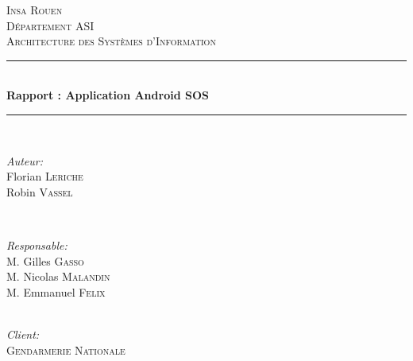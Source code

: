 \documentclass[a4paper,10pt]{report}
\begin{document}
\begin{titlepage}
	
	\newcommand{\HRule}{\rule{\linewidth}{0.5mm}}
	
	\center 
	
	
	\textsc{\LARGE Insa Rouen}\\[1.5cm] 
	\textsc{\Large Département ASI}\\[0.5cm] 
	\textsc{\large Architecture des Systèmes d'Information}\\[0.5cm] 
	
	
	\HRule \\[0.4cm]
	{ \huge \bfseries Rapport : Application Android SOS}\\[0.4cm] 
	\HRule \\[1.5cm]
	
	
	
	\begin{minipage}{0.4\textwidth}
		\begin{flushleft} \large
			\emph{Auteur:}\\
			Florian \textsc{Leriche}\\
			Robin \textsc{Vassel}
		\end{flushleft}
	\end{minipage}
	~
	\begin{minipage}{0.4\textwidth}
		\begin{flushright} \large
			\emph{Responsable:} \\
			M. Gilles \textsc{Gasso}\\
			M. Nicolas \textsc{Malandin}\\
			M. Emmanuel \textsc{Felix}\\
		\end{flushright}
	\end{minipage}\\[2cm]
	
	
	\Large \emph{Client:}\\
	\textsc{Gendarmerie Nationale} \\[2cm]
	

\end{titlepage}
\end{document}
